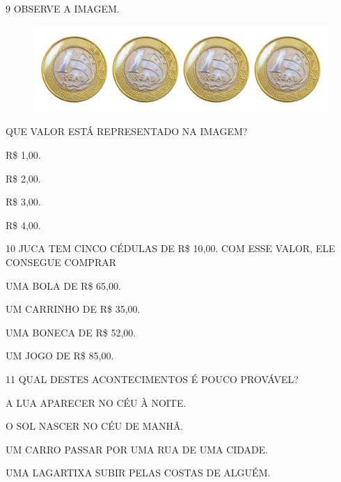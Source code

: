 \num{9} OBSERVE A IMAGEM.


\begin{figure}[H]
\centering
\includegraphics[width=.6\textwidth]{./media/SAEB_1ANO_MAT_FIGURA124.png}
\end{figure}

QUE VALOR ESTÁ REPRESENTADO NA IMAGEM?

\begin{multicols}{2}
\begin{escolha}
\item R\$ 1,00.

\item R\$ 2,00.

\item R\$ 3,00.

\item R\$ 4,00.
\end{escolha}
\end{multicols}

\num{10} JUCA TEM CINCO CÉDULAS DE R\$ 10,00. COM ESSE VALOR, ELE CONSEGUE COMPRAR

\begin{multicols}{2}
\begin{escolha}[itemsep=0pt]
\item UMA BOLA DE R\$ 65,00.

\item UM CARRINHO DE R\$ 35,00.

\item UMA BONECA DE R\$ 52,00.

\item UM JOGO DE R\$ 85,00.
\end{escolha}
\end{multicols}

\num{11} QUAL DESTES ACONTECIMENTOS É POUCO PROVÁVEL?

\begin{escolha}[itemsep=0pt]
\item A LUA APARECER NO CÉU À NOITE.

\item O SOL NASCER NO CÉU DE MANHÃ.

\item UM CARRO PASSAR POR UMA RUA DE UMA CIDADE.

\item UMA LAGARTIXA SUBIR PELAS COSTAS DE ALGUÉM.
\end{escolha}

